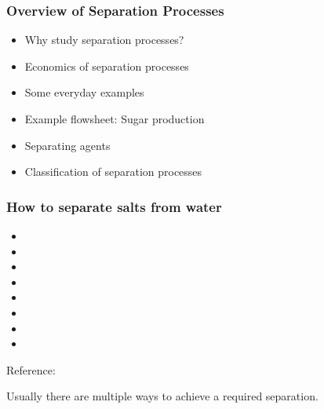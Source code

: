 

\begin{frame}\frametitle{Overview of Separation Processes}

	\begin{itemize}
		\item	Why study separation processes?
		\item	Economics of separation processes
		\item	Some everyday examples
		\item	Example flowsheet: Sugar production
		\item	Separating agents
		\item	Classification of separation processes
	\end{itemize}
\end{frame}



\begin{frame}\frametitle{How to separate salts from water}
	\begin{itemize}
		\item	\iftoggle{instructor}{\href{http://en.wikipedia.org/wiki/Electrodialysis}{electrodialysis}}{\href{http://en.wikipedia.org/wiki/Electrodialysis}{electrodialysis}}
		\item	\iftoggle{instructor}{\href{http://en.wikipedia.org/wiki/Electrodeionization}{electrodeionization}}{\href{http://en.wikipedia.org/wiki/Electrodeionization}{electrodeionization}}
		\item	\pause\iftoggle{instructor}{evaporation through heating with condensation}{}
		\item	\iftoggle{instructor}{evaporation under vacuum}{}
		\item	\iftoggle{instructor}{freezing to form ice crystals}{}
		\item	\iftoggle{instructor}{reverse osmosis}{}
		\item	\iftoggle{instructor}{ion exchange}{}
		\item	\iftoggle{instructor}{apply pressure and force it through a membrane that delays (filters out) salts}{}
	\end{itemize}
	Reference: 
	\vspace{12pt}

	Usually there are multiple ways to achieve a required separation.
\end{frame}

